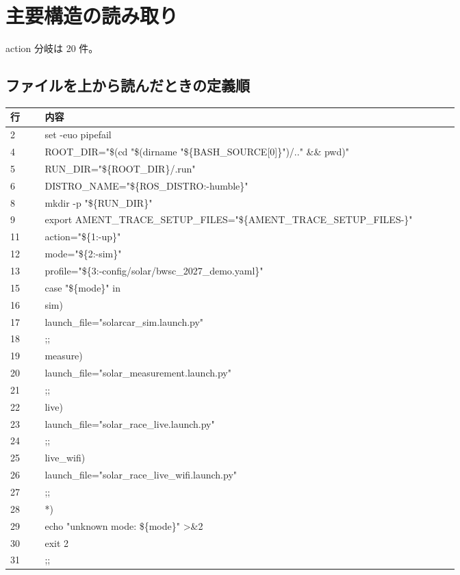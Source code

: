 \documentclass[a4paper,11pt]{article}
\begin{document}
        \section*{主要構造の読み取り}
        action 分岐は 20 件。



        \subsection*{ファイルを上から読んだときの定義順}
            \begin{longtable}{p{0.07\linewidth} p{0.84\linewidth}}
            \toprule
            行 & 内容 \\
            \midrule
            2 & set -euo pipefail \\
4 & ROOT\_DIR="\$(cd "\$(dirname "\$\{BASH\_SOURCE[0]\}")/.." \&\& pwd)" \\
5 & RUN\_DIR="\$\{ROOT\_DIR\}/.run" \\
6 & DISTRO\_NAME="\$\{ROS\_DISTRO:-humble\}" \\
8 & mkdir -p "\$\{RUN\_DIR\}" \\
9 & export AMENT\_TRACE\_SETUP\_FILES="\$\{AMENT\_TRACE\_SETUP\_FILES-\}" \\
11 & action="\$\{1:-up\}" \\
12 & mode="\$\{2:-sim\}" \\
13 & profile="\$\{3:-config/solar/bwsc\_2027\_demo.yaml\}" \\
15 & case "\$\{mode\}" in \\
16 & sim) \\
17 & launch\_file="solarcar\_sim.launch.py" \\
18 & ;; \\
19 & measure) \\
20 & launch\_file="solar\_measurement.launch.py" \\
21 & ;; \\
22 & live) \\
23 & launch\_file="solar\_race\_live.launch.py" \\
24 & ;; \\
25 & live\_wifi) \\
26 & launch\_file="solar\_race\_live\_wifi.launch.py" \\
27 & ;; \\
28 & *) \\
29 & echo "unknown mode: \$\{mode\}" >\&2 \\
30 & exit 2 \\
31 & ;; \\

\end{longtable}
\end{document}
